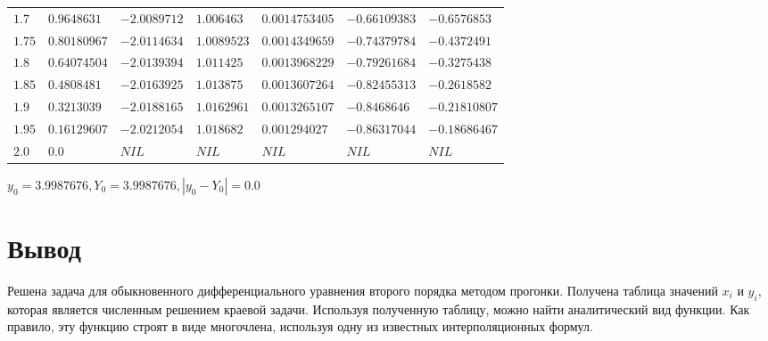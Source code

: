 \begin{table}[h!]
\begin{tabular}{|p{3ex}|l|l|l|l|l|l|}
		$ 1.7 $ & $  0.9648631 $ & $ -2.0089712 $ & $   1.006463 $ & $ 0.0014753405 $ & $ -0.66109383 $ & $  -0.6576853 $ \\
		$1.75 $ & $ 0.80180967 $ & $ -2.0114634 $ & $  1.0089523 $ & $ 0.0014349659 $ & $ -0.74379784 $ & $  -0.4372491 $ \\
		$ 1.8 $ & $ 0.64074504 $ & $ -2.0139394 $ & $   1.011425 $ & $ 0.0013968229 $ & $ -0.79261684 $ & $  -0.3275438 $ \\
		$1.85 $ & $  0.4808481 $ & $ -2.0163925 $ & $   1.013875 $ & $ 0.0013607264 $ & $ -0.82455313 $ & $  -0.2618582 $ \\
		$ 1.9 $ & $  0.3213039 $ & $ -2.0188165 $ & $  1.0162961 $ & $ 0.0013265107 $ & $  -0.8468646 $ & $ -0.21810807 $ \\
		$1.95 $ & $ 0.16129607 $ & $ -2.0212054 $ & $   1.018682 $ & $  0.001294027 $ & $ -0.86317044 $ & $ -0.18686467 $ \\
		$ 2.0 $ & $        0.0 $ & $ NIL        $ & $ NIL        $ & $ NIL          $ & $ NIL         $ & $ NIL         $ \\
		\hline
	\end{tabular}
\end{table}

$y_0 = 3.9987676, Y_0 = 3.9987676, |y_0 - Y_0| = 0.0$
\section{Вывод}
Решена задача для обыкновенного дифференциального уравнения второго порядка методом прогонки. Получена таблица значений \(x_i\) и \(y_i\), которая является численным решением краевой задачи. Используя полученную таблицу, можно найти аналитический вид функции. Как правило, эту функцию строят в виде многочлена, используя одну из известных интерполяционных формул.
